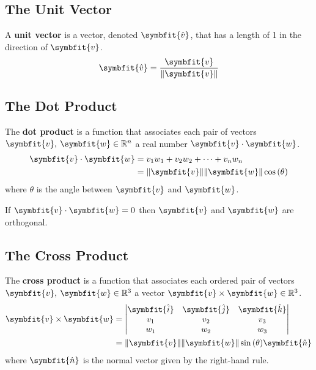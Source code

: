 \documentclass{article}
\begin{document}
	\subsection{The Unit Vector}
		\begin{definition}
			A \textbf{unit vector} is a vector, denoted $\symbfit{\hat{v}}$, that has a length of 1 in the direction of $\symbfit{v}$.
			\begin{equation*}
				\symbfit{\hat{v}} = \frac{\symbfit{v}}{\norm{\symbfit{v}}}
			\end{equation*}
		\end{definition}
	\subsection{The Dot Product}
		\begin{definition}
			The \textbf{dot product} is a function that associates each pair of vectors $\symbfit{v},\: \symbfit{w} \in \mathbb{R}^n$ a real number $\symbfit{v}\cdot\symbfit{w}$.
			\begin{align*}
				\symbfit{v}\cdot\symbfit{w} &= v_1 w_1 + v_2 w_2 + \cdots + v_n w_n \\
									&= \norm{\symbfit{v}} \norm{\symbfit{w}} \cos{\left(\theta\right)}
			\end{align*}
			where $\theta$ is the angle between $\symbfit{v}$ and $\symbfit{w}$.
		\end{definition}
		\begin{theorem}
			If $\symbfit{v} \cdot \symbfit{w}=0$ then $\symbfit{v}$ and $\symbfit{w}$ are orthogonal. 
		\end{theorem} 
	\subsection{The Cross Product}
		\begin{definition}
			The \textbf{cross product} is a function that associates each ordered pair of vectors $\symbfit{v},\: \symbfit{w}\in \mathbb{R}^3$ a vector $\symbfit{v}\times\symbfit{w}\in \mathbb{R}^3$.
			\begin{align*}
				\symbfit{v}\times\symbfit{w} &= 
				\mqty|
					\symbfit{\hat{i}} & \symbfit{\hat{j}} & \symbfit{\hat{k}} \\
					v_1 & v_2 & v_3 \\
					w_1 & w_2 & w_3
				| \\
				&= \norm{\symbfit{v}}\norm{\symbfit{w}}\sin{\left(\theta\right)}\symbfit{\hat{n}}
			\end{align*}
			where $\symbfit{\hat{n}}$ is the normal vector given by the right-hand rule.
		\end{definition}
	\newpage
\end{document}
